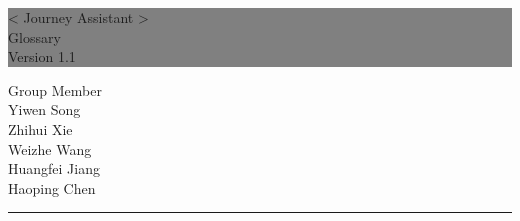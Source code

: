 \documentclass[10pt]{article}
\begin{document}

\begin{titlepage} %
	
	
	\colorbox{grey}{
		\parbox[t]{1.1\textwidth}{ %
			\parbox[t]{1.02\textwidth}{ %
				\raggedleft %
				\fontsize{34pt}{40pt}\selectfont %
				\vspace{0.7cm} %
				
				< Journey Assistant >\\
                Glossary\\
                Version 1.1\\
				
				\vspace{0.7cm} %
			}
		}
	}
	
	\vfill %
	
	
	\parbox[t]{1\textwidth}{ %
		\raggedleft %
		\large %
		{\Large Group Member}\\[4pt] %
        Yiwen Song\\
        Zhihui Xie\\
        Weizhe Wang\\
        Huangfei Jiang\\
        Haoping Chen\\
		
		\hfill\rule{0.2\linewidth}{1pt}%
    }
    
	
\end{titlepage}
\end{document}
